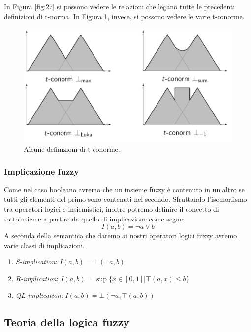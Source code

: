 \documentclass[10pt,a4paper]{article}
\begin{document}
In Figura \ref{fig:27} si possono vedere le relazioni che legano tutte le precedenti definizioni di t-norma. In Figura \ref{fig:28}, invece, si possono vedere le varie t-conorme.

\begin{figure}
\centering
\includegraphics[scale=0.3]{img/tconorme.png}
\caption{Alcune definizioni di t-conorme.}
\label{fig:28}
\end{figure}

\subsubsection{Implicazione fuzzy}

Come nel caso booleano avremo che un insieme fuzzy è contenuto in un altro se tutti gli elementi del primo sono contenuti nel secondo. Sfruttando l'isomorfismo tra operatori logici e insiemistici, inoltre potremo definire il concetto di sottoinsieme a partire da quello di implicazione come segue:
$$
I(a,b) = \neg a \vee b
$$
A seconda della semantica che daremo ai nostri operatori logici fuzzy avremo varie classi di implicazioni. 

\begin{enumerate}
\item{\emph{S-implication}: $I(a,b) = \bot(\neg a, b)$}
\item{\emph{R-implication}: $I(a,b) = \sup \{x \in [0,1] | \top(a,x) \leq b\}$}
\item{\emph{QL-implication}: $I(a,b) = \bot(\neg a, \top(a,b))$}
\end{enumerate}

\subsection{Teoria della logica fuzzy}
\end{document}
